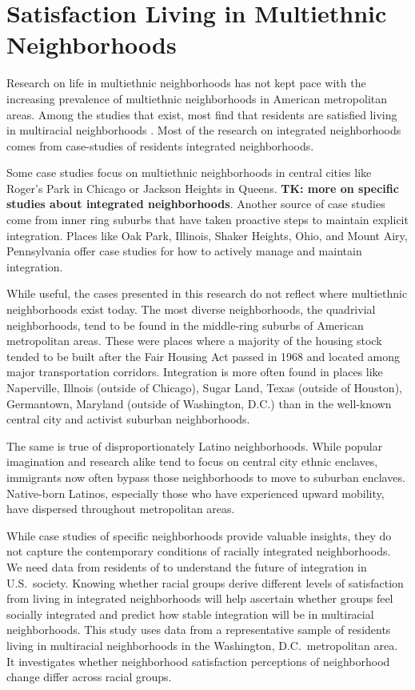 \documentclass[11pt]{baderart}
\begin{document}
\section{Satisfaction Living in Multiethnic Neighborhoods}
Research on life in multiethnic neighborhoods has not kept pace with the increasing prevalence of multiethnic neighborhoods in American metropolitan areas. Among the studies that exist, most find that residents are satisfied living in multiracial neighborhoods \needcite. Most of the research on integrated neighborhoods comes from case-studies of residents integrated neighborhoods. 

Some case studies focus on multiethnic neighborhoods in central cities like Roger's Park in Chicago or Jackson Heights in Queens. \textbf{TK: more on specific studies about integrated neighborhoods}. Another source of case studies come from inner ring suburbs that have taken proactive steps to maintain explicit integration. Places like Oak Park, Illinois, Shaker Heights, Ohio, and Mount Airy, Pennsylvania offer case studies for how to actively manage and maintain integration. 

While useful, the cases presented in this research do not reflect where multiethnic neighborhoods exist today. The most diverse neighborhoods, the quadrivial neighborhoods, tend to be found in the middle-ring suburbs of American metropolitan areas. These were places where a majority of the housing stock tended to be built after the Fair Housing Act passed in 1968 and located among major transportation corridors. Integration is more often found in places like Naperville, Illnois (outside of Chicago), Sugar Land, Texas (outside of Houston), Germantown, Maryland (outside of Washington, D.C.) than in the well-known central city and activist suburban neighborhoods. 

The same is true of disproportionately Latino neighborhoods. While popular imagination and research alike tend to focus on central city ethnic enclaves, immigrants now often bypass those neighborhoods to move to suburban enclaves. Native-born Latinos, especially those who have experienced upward mobility, have dispersed throughout metropolitan areas. 

While case studies of specific neighborhoods provide valuable insights, they do not capture the contemporary conditions of racially integrated neighborhoods. We need data from residents of to understand the future of integration in U.S.\ society. Knowing whether racial groups derive different levels of satisfaction from living in integrated neighborhoods will help ascertain whether groups feel socially integrated and predict how stable integration will be in multiracial neighborhoods. This study uses data from a representative sample of residents living in multiracial neighborhoods in the Washington, D.C.\ metropolitan area. It investigates whether neighborhood satisfaction perceptions of neighborhood change differ across racial groups. 
\end{document}
